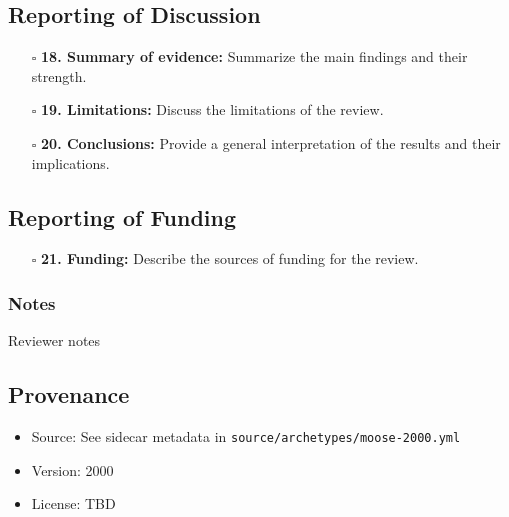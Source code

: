 \documentclass[11pt]{article}
\def\tightlist{}
\begin{document}
\begin{Form}
\subsection{Reporting of Discussion}\label{reporting-of-discussion}

\begin{itemize}
\tightlist
\item[$\square$]
  \textbf{18. Summary of evidence:} Summarize the main findings and
  their strength.
\item[$\square$]
  \textbf{19. Limitations:} Discuss the limitations of the review.
\item[$\square$]
  \textbf{20. Conclusions:} Provide a general interpretation of the
  results and their implications.
\end{itemize}

\subsection{Reporting of Funding}\label{reporting-of-funding}

\begin{itemize}
\tightlist
\item[$\square$]
  \textbf{21. Funding:} Describe the sources of funding for the review.
\end{itemize}

\subsubsection{Notes}\label{notes}

{Reviewer notes}

\subsection{Provenance}\label{provenance}

\begin{itemize}
\tightlist
\item
  Source: See sidecar metadata in
  \texttt{source/archetypes/moose-2000.yml}
\item
  Version: 2000
\item
  License: TBD
\end{itemize}

\end{Form}
\end{document}
